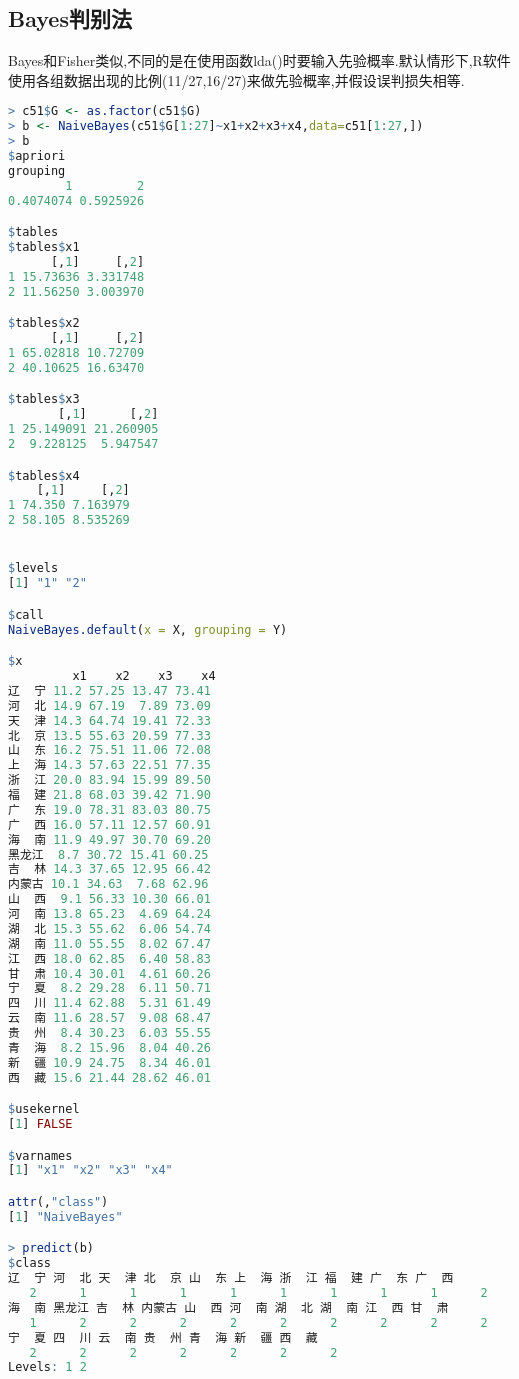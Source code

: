 \documentclass[11pt,a4paper,oneside]{book}
\begin{document}
\subsection{Bayes判别法}
Bayes和Fisher类似,不同的是在使用函数lda()时要输入先验概率.默认情形下,R软件使用各组数据出现的比例(11/27,16/27)来做先验概率,并假设误判损失相等.
\begin{lstlisting}[language=r]
> c51$G <- as.factor(c51$G)
> b <- NaiveBayes(c51$G[1:27]~x1+x2+x3+x4,data=c51[1:27,])
> b
$apriori
grouping
        1         2 
0.4074074 0.5925926 

$tables
$tables$x1
      [,1]     [,2]
1 15.73636 3.331748
2 11.56250 3.003970

$tables$x2
      [,1]     [,2]
1 65.02818 10.72709
2 40.10625 16.63470

$tables$x3
       [,1]      [,2]
1 25.149091 21.260905
2  9.228125  5.947547

$tables$x4
    [,1]     [,2]
1 74.350 7.163979
2 58.105 8.535269


$levels
[1] "1" "2"

$call
NaiveBayes.default(x = X, grouping = Y)

$x
         x1    x2    x3    x4
辽  宁 11.2 57.25 13.47 73.41
河  北 14.9 67.19  7.89 73.09
天  津 14.3 64.74 19.41 72.33
北  京 13.5 55.63 20.59 77.33
山  东 16.2 75.51 11.06 72.08
上  海 14.3 57.63 22.51 77.35
浙  江 20.0 83.94 15.99 89.50
福  建 21.8 68.03 39.42 71.90
广  东 19.0 78.31 83.03 80.75
广  西 16.0 57.11 12.57 60.91
海  南 11.9 49.97 30.70 69.20
黑龙江  8.7 30.72 15.41 60.25
吉  林 14.3 37.65 12.95 66.42
内蒙古 10.1 34.63  7.68 62.96
山  西  9.1 56.33 10.30 66.01
河  南 13.8 65.23  4.69 64.24
湖  北 15.3 55.62  6.06 54.74
湖  南 11.0 55.55  8.02 67.47
江  西 18.0 62.85  6.40 58.83
甘  肃 10.4 30.01  4.61 60.26
宁  夏  8.2 29.28  6.11 50.71
四  川 11.4 62.88  5.31 61.49
云  南 11.6 28.57  9.08 68.47
贵  州  8.4 30.23  6.03 55.55
青  海  8.2 15.96  8.04 40.26
新  疆 10.9 24.75  8.34 46.01
西  藏 15.6 21.44 28.62 46.01

$usekernel
[1] FALSE

$varnames
[1] "x1" "x2" "x3" "x4"

attr(,"class")
[1] "NaiveBayes"

> predict(b)
$class
辽  宁 河  北 天  津 北  京 山  东 上  海 浙  江 福  建 广  东 广  西 
   2      1      1      1      1      1      1      1      1      2 
海  南 黑龙江 吉  林 内蒙古 山  西 河  南 湖  北 湖  南 江  西 甘  肃 
   1      2      2      2      2      2      2      2      2      2 
宁  夏 四  川 云  南 贵  州 青  海 新  疆 西  藏 
   2      2      2      2      2      2      2 
Levels: 1 2


\end{lstlisting}
\end{document}
